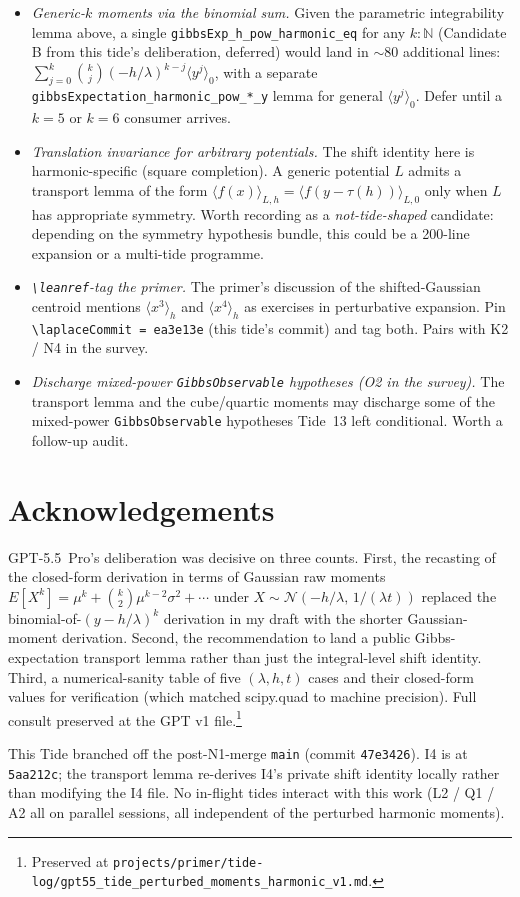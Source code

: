 \documentclass[11pt]{article}
\begin{document}
\begin{itemize}
\item \emph{Generic-$k$ moments via the binomial sum.} Given the
  parametric integrability lemma above, a single
  \texttt{gibbsExp\_h\_pow\_harmonic\_eq} for any $k : \mathbb N$
  (Candidate B from this tide's deliberation, deferred) would land in
  $\sim$80 additional lines: $\sum_{j=0}^{k} \binom{k}{j}
  (-h/\lambda)^{k-j} \langle y^j\rangle_0$, with a separate
  \texttt{gibbsExpectation\_harmonic\_pow\_*\_y} lemma for general
  $\langle y^j\rangle_0$. Defer until a $k = 5$ or $k = 6$ consumer
  arrives.
\item \emph{Translation invariance for arbitrary potentials.} The
  shift identity here is harmonic-specific (square completion). A
  generic potential $L$ admits a transport lemma of the form
  $\langle f(x)\rangle_{L, h} = \langle f(y - \tau(h))\rangle_{L, 0}$
  only when $L$ has appropriate symmetry. Worth recording as a
  \emph{not-tide-shaped} candidate: depending on the symmetry hypothesis
  bundle, this could be a 200-line expansion or a multi-tide
  programme.
\item \emph{\texttt{\textbackslash leanref}-tag the primer.} The
  primer's discussion of the shifted-Gaussian centroid mentions
  $\langle x^3\rangle_h$ and $\langle x^4\rangle_h$ as exercises in
  perturbative expansion. Pin
  \texttt{\textbackslash laplaceCommit = ea3e13e} (this tide's commit)
  and tag both. Pairs with K2 / N4 in the survey.
\item \emph{Discharge mixed-power \texttt{GibbsObservable} hypotheses
  (O2 in the survey).} The transport lemma and the cube/quartic moments
  may discharge some of the mixed-power \texttt{GibbsObservable}
  hypotheses Tide~13 left conditional. Worth a follow-up audit.
\end{itemize}

\section*{Acknowledgements}

GPT-5.5~Pro's deliberation was decisive on three counts. First, the
recasting of the closed-form derivation in terms of Gaussian raw
moments $E[X^k] = \mu^k + \binom{k}{2}\mu^{k-2}\sigma^2 + \cdots$
under $X \sim \mathcal N(-h/\lambda,\,1/(\lambda t))$ replaced the
binomial-of-$(y - h/\lambda)^k$ derivation in my draft with the
shorter Gaussian-moment derivation. Second, the recommendation to
land a public Gibbs-expectation transport lemma rather than just the
integral-level shift identity. Third, a numerical-sanity table of
five $(\lambda, h, t)$ cases and their closed-form values for
verification (which matched scipy.quad to machine precision). Full
consult preserved at the GPT v1 file.\footnote{Preserved at
\texttt{projects/primer/tide-log/gpt55\_tide\_perturbed\_moments\_harmonic\_v1.md}.}

This Tide branched off the post-N1-merge \texttt{main} (commit
\texttt{47e3426}). I4 is at \texttt{5aa212c}; the transport lemma
re-derives I4's private shift identity locally rather than modifying
the I4 file. No in-flight tides interact with this work (L2 / Q1 / A2
all on parallel sessions, all independent of the perturbed harmonic
moments).
\end{document}
